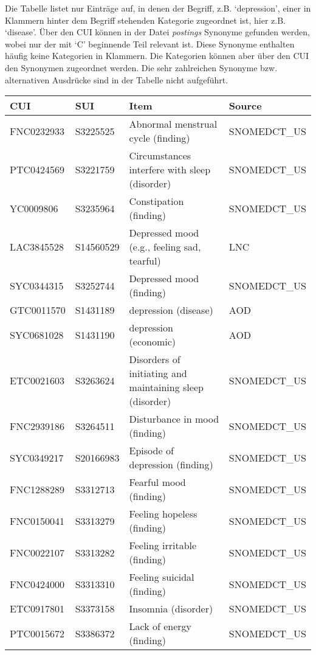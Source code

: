 Die Tabelle listet nur Einträge auf, in denen der Begriff, z.B. `depression', einer in Klammern hinter dem Begriff stehenden Kategorie zugeordnet ist, hier z.B. `disease'. Über den CUI können in der Datei \emph{postings} Synonyme gefunden werden, wobei nur der mit `C' beginnende Teil relevant ist. Diese Synonyme enthalten häufig keine Kategorien in Klammern. Die Kategorien können aber über den CUI den Synonymen zugeordnet werden. Die sehr zahlreichen Synonyme bzw. alternativen Ausdrücke sind in der Tabelle nicht aufgeführt.

\begin{center}
\begin{tabular}{llll}
\hline
\textbf{CUI}	& \textbf{SUI}	& \textbf{Item} & \textbf{Source} \\
\hline
FNC0232933 &	S3225525 & \parbox[t]{5cm}{Abnormal menstrual cycle (finding)} &	SNOMEDCT\_US \\
PTC0424569 &	S3221759 & \parbox[t]{5cm}{Circumstances interfere with sleep (disorder)} &	SNOMEDCT\_US \\
YC0009806 & S3235964 & Constipation (finding) &	SNOMEDCT\_US \\
LAC3845528 &	S14560529 &\parbox[t]{5cm}{Depressed mood (e.g., feeling sad, tearful)} & LNC \\
SYC0344315 &	S3252744 &	Depressed mood (finding) &	SNOMEDCT\_US \\
GTC0011570 &	S1431189 &	depression (disease) & AOD \\
SYC0681028 &	S1431190 &	depression (economic) & AOD \\
ETC0021603 &	S3263624 &	\parbox[t]{5cm}{Disorders of initiating and maintaining sleep (disorder)} & SNOMEDCT\_US \\
FNC2939186 &	S3264511 &	Disturbance in mood (finding) & SNOMEDCT\_US \\
SYC0349217 &	S20166983 & Episode of depression (finding) & SNOMEDCT\_US \\
FNC1288289 &	S3312713 &	Fearful mood (finding) & SNOMEDCT\_US \\
FNC0150041 &	S3313279 &	Feeling hopeless (finding) &	SNOMEDCT\_US \\
FNC0022107 &	S3313282 &	Feeling irritable (finding)	 & SNOMEDCT\_US \\
FNC0424000 &	S3313310 &	Feeling suicidal (finding) &	SNOMEDCT\_US \\
ETC0917801 &	S3373158 &	Insomnia (disorder) &	SNOMEDCT\_US \\
PTC0015672 &	S3386372 &	Lack of energy (finding) &	SNOMEDCT\_US \\

\end{tabular}
\end{center}
